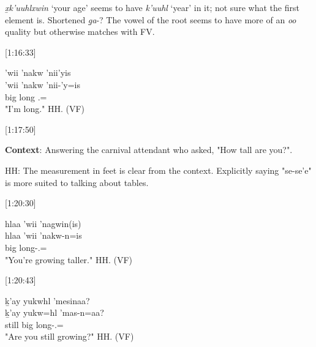 \textit{x̱k'uuhlxwin} `your age' seems to have \textit{k'uuhl} `year' in it; not sure what the first element is. Shortened \textit{g̱a}-? The vowel of the root seems to have more of an \textit{oo} quality but otherwise matches with FV.

[1:16:33]
\begin{exe}
    \ex \glll
    'wii 'nakw 'nii'yis \\
    'wii 'nakw 'nii-'y=is \\
    big long \Fsg.\Iii=\Qudd \\
    \glt "I'm long." \hfill HH.\ElicitationDate{} (VF)
\end{exe}

[1:17:50]
\begin{exe}
    \ex \textbf{Context}: Answering the carnival attendant who asked, "How tall are you?".
    \begin{xlist}

    \end{xlist}
\end{exe}

HH: The measurement in feet is clear from the context. Explicitly saying "se-se'e" is more suited to talking about tables.

[1:20:30]
\begin{exe}
    \ex \glll
    hlaa 'wii 'nagwin(is) \\
    hlaa 'wii 'nakw-n=is \\
    \Incep{} big long-\Ssg.\Ii=\Qudd \\
    \glt "You're growing taller." \hfill HH.\ElicitationDate{} (VF)
\end{exe}

[1:20:43]
\begin{exe}
    \ex \glll
    ḵ'ay yukwhl 'mesinaa? \\
    ḵ'ay yukw=hl 'mas-n=aa? \\
    still big long-\Ssg.\Ii=\Qudd \\
    \glt "Are you still growing?" \hfill HH.\ElicitationDate{} (VF)
\end{exe}

